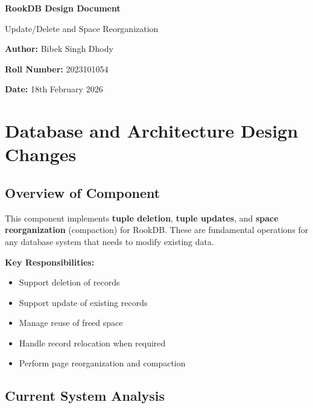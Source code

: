 \documentclass[11pt,a4paper]{article}
\begin{document}
\begin{titlepage}
    \centering
    \vspace*{2cm}
    {\Huge\bfseries RookDB Design Document\par}
    \vspace{1cm}
    {\Large Update/Delete and Space Reorganization\par}
    \vspace{2cm}
    {\large\textbf{Author:} Bibek Singh Dhody\par}
    {\large\textbf{Roll Number:} 2023101054\par}
    \vspace{1cm}
    {\large\textbf{Date:} 18th February 2026\par}
    \vfill
\end{titlepage}

\tableofcontents
\newpage

\section{Database and Architecture Design Changes}

\subsection{Overview of Component}

This component implements \textbf{tuple deletion}, \textbf{tuple updates}, and \textbf{space reorganization} (compaction) for RookDB. These are fundamental operations for any database system that needs to modify existing data.

\textbf{Key Responsibilities:}
\begin{itemize}
    \item Support deletion of records
    \item Support update of existing records
    \item Manage reuse of freed space
    \item Handle record relocation when required
    \item Perform page reorganization and compaction
\end{itemize}

\subsection{Current System Analysis}
\end{document}
